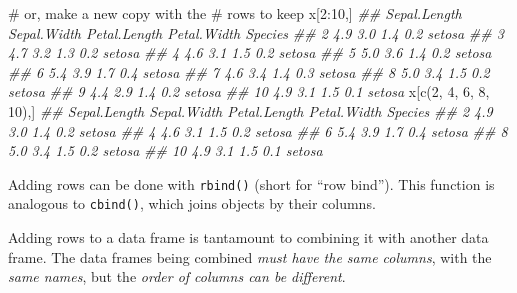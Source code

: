 \documentclass[
  13,
  letterpaper,
]{report}
\newenvironment{Shaded}{\begin{snugshade}}{\end{snugshade}}
\newcommand{\CommentTok}[1]{\textcolor[rgb]{0.37,0.37,0.37}{#1}}
\newcommand{\DecValTok}[1]{\textcolor[rgb]{0.68,0.00,0.00}{#1}}
\newcommand{\DocumentationTok}[1]{\textcolor[rgb]{0.37,0.37,0.37}{\textit{#1}}}
\newcommand{\FunctionTok}[1]{\textcolor[rgb]{0.28,0.35,0.67}{#1}}
\newcommand{\NormalTok}[1]{\textcolor[rgb]{0.00,0.23,0.31}{#1}}
\newcommand{\SpecialCharTok}[1]{\textcolor[rgb]{0.37,0.37,0.37}{#1}}
\begin{document}
\begin{Shaded}
\begin{Highlighting}[]
\CommentTok{\# or, make a new copy with the }
\CommentTok{\# rows to keep}
\NormalTok{x[}\DecValTok{2}\SpecialCharTok{:}\DecValTok{10}\NormalTok{,]}
\DocumentationTok{\#\#    Sepal.Length Sepal.Width Petal.Length Petal.Width Species}
\DocumentationTok{\#\# 2           4.9         3.0          1.4         0.2  setosa}
\DocumentationTok{\#\# 3           4.7         3.2          1.3         0.2  setosa}
\DocumentationTok{\#\# 4           4.6         3.1          1.5         0.2  setosa}
\DocumentationTok{\#\# 5           5.0         3.6          1.4         0.2  setosa}
\DocumentationTok{\#\# 6           5.4         3.9          1.7         0.4  setosa}
\DocumentationTok{\#\# 7           4.6         3.4          1.4         0.3  setosa}
\DocumentationTok{\#\# 8           5.0         3.4          1.5         0.2  setosa}
\DocumentationTok{\#\# 9           4.4         2.9          1.4         0.2  setosa}
\DocumentationTok{\#\# 10          4.9         3.1          1.5         0.1  setosa}
\NormalTok{x[}\FunctionTok{c}\NormalTok{(}\DecValTok{2}\NormalTok{, }\DecValTok{4}\NormalTok{, }\DecValTok{6}\NormalTok{, }\DecValTok{8}\NormalTok{, }\DecValTok{10}\NormalTok{),]}
\DocumentationTok{\#\#    Sepal.Length Sepal.Width Petal.Length Petal.Width Species}
\DocumentationTok{\#\# 2           4.9         3.0          1.4         0.2  setosa}
\DocumentationTok{\#\# 4           4.6         3.1          1.5         0.2  setosa}
\DocumentationTok{\#\# 6           5.4         3.9          1.7         0.4  setosa}
\DocumentationTok{\#\# 8           5.0         3.4          1.5         0.2  setosa}
\DocumentationTok{\#\# 10          4.9         3.1          1.5         0.1  setosa}
\end{Highlighting}
\end{Shaded}

Adding rows can be done with \texttt{rbind()} (short for ``row bind'').
This function is analogous to \texttt{cbind()}, which joins objects by
their columns.

Adding rows to a data frame is tantamount to combining it with another
data frame. The data frames being combined \emph{must have the same
columns}, with the \emph{same names}, but the \emph{order of columns can
be different}.
\end{document}
